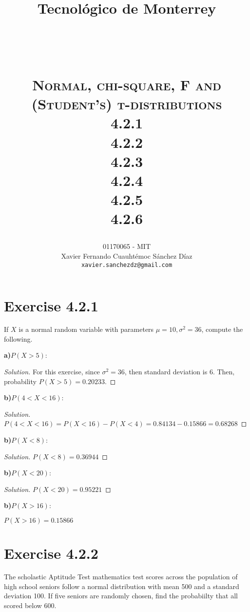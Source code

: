 \documentclass[titlepage, letterpaper, fleqn]{article}
\title{
\vspace{1in}
\textbf{Tecnológico de Monterrey} \\
\vspace{0.5in}
\textmd{\mahclass} \\
\large{\textit{\mahteacher}} \\
\vspace{0.5in}
\textsc{\mahtitle}\\
\textsc{Normal, chi-square, F and (Student's) t-distributions}\\
\textsc{4.2.1}\\
\textsc{4.2.2}\\
\textsc{4.2.3}\\
\textsc{4.2.4}\\
\textsc{4.2.5}\\
\textsc{4.2.6}\\
\author{01170065  - MIT \\
Xavier Fernando Cuauhtémoc Sánchez Díaz \\
\texttt{xavier.sanchezdz@gmail.com}}
\date{\mahdate}
}
\newcommand{\spacepls}{\vspace{5mm}}
\renewcommand\qedsymbol{\(\blacksquare\)}
\newenvironment{solution}
{\renewcommand\qedsymbol{$\square$}\begin{proof}[Solution]}
{\end{proof}}
\begin{document}
\begin{titlepage}
\maketitle
\end{titlepage}

%
%

\section{Exercise 4.2.1}

{\large If $X$ is a normal random variable with parameters $\mu = 10, \sigma^2 = 36$, compute the following.

\textbf{a)}$P(X > 5)$:}

\begin{solution}
For this exercise, since $\sigma^2 = 36$, then standard deviation is 6.
Then, probability $P(X > 5)= 0.20233$.
\end{solution}

\spacepls

{\large \textbf{b)}$P(4 < X < 16)$:}

\begin{solution}
$P(4 < X < 16)= P(X < 16) - P(X < 4) = 0.84134 - 0.15866 = 0.68268$
\end{solution}

\spacepls

{\large \textbf{b)}$P(X < 8)$:}

\begin{solution}
$P(X < 8) = 0.36944$
\end{solution}

\spacepls

{\large \textbf{b)}$P(X < 20)$:}

\begin{solution}
$P(X < 20) = 0.95221$
\end{solution}

\spacepls

{\large \textbf{b)}$P(X > 16)$:}

$P(X > 16) = 0.15866$

\spacepls

\section{Exercise 4.2.2}

{\large The scholastic Aptitude Test mathematics test scores across the population of high school seniors follow a normal distribution with mean 500 and a standard deviation 100.
If five seniors are randomly chosen, find the probabiilty that all scored below 600.}
\end{document}
